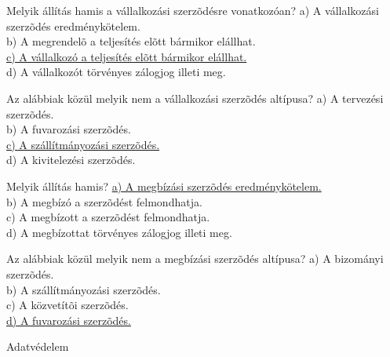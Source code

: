 \begin{frame}

\begin{tcolorbox}[title={172. Kérdés}]
Melyik állítás hamis a vállalkozási szerzõdésre vonatkozóan?
\tcblower
a) A vállalkozási szerzõdés eredménykötelem.\\
b) A megrendelõ a teljesítés elõtt bármikor elállhat.\\
\uline {c) A vállalkozó a teljesítés elõtt bármikor elállhat.}\\
d) A vállalkozót törvényes zálogjog illeti meg.
\end{tcolorbox}

\begin{tcolorbox}[title={173. Kérdés}]
Az alábbiak közül melyik nem a vállalkozási szerzõdés altípusa?
\tcblower
a) A tervezési szerzõdés.\\
b) A fuvarozási szerzõdés.\\
\uline {c) A szállítmányozási szerzõdés.}\\
d) A kivitelezési szerzõdés.
\end{tcolorbox}

\begin{tcolorbox}[title={174. Kérdés}]
Melyik állítás hamis?
\tcblower
\uline {a) A megbízási szerzõdés eredménykötelem.}\\
b) A megbízó a szerzõdést felmondhatja.\\
c) A megbízott a szerzõdést felmondhatja.\\
d) A megbízottat törvényes zálogjog illeti meg.
\end{tcolorbox}

\begin{tcolorbox}[title={175. Kérdés}]
Az alábbiak közül melyik nem a megbízási szerzõdés altípusa?
\tcblower
a) A bizományi szerzõdés.\\
b) A szállítmányozási szerzõdés.\\
c) A közvetítõi szerzõdés.\\
\uline {d) A fuvarozási szerzõdés.}
\end{tcolorbox}

\end{frame}

\begin{frame}[plain]
\begin{tcolorbox}[center, colback={myyellow}, coltext={black}, colframe={myyellow}]
    { Adatvédelem}\\
\end{tcolorbox}
\end{frame}

